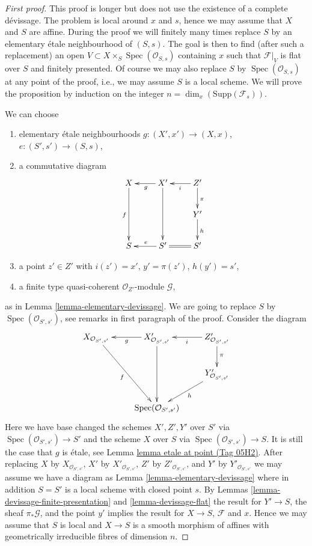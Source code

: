 \documentclass{amsart}
\theoremstyle{plain}
\theoremstyle{definition}
\theoremstyle{remark}
\numberwithin{equation}{subsection}
\def\Spec{\mathop{\mathrm{Spec}}}
\begin{document}
\begin{proof}[First proof]
This proof is longer but does not use the existence of a complete d\'evissage.
The problem is local around $x$ and $s$, hence we may assume that $X$
and $S$ are affine. During the proof we will finitely many times replace
$S$ by an elementary \'etale neighbourhood of $(S, s)$. The goal is then to find
(after such a replacement) an open
$V \subset X \times_S \Spec(\mathcal{O}_{S, s})$ containing $x$
such that $\mathcal{F}|_V$ is flat over $S$ and finitely presented.
Of course we may also replace $S$ by $\Spec(\mathcal{O}_{S, s})$
at any point of the proof, i.e., we may assume $S$ is a local scheme.
We will prove the proposition by induction on the integer
$n = \dim_x(\text{Supp}(\mathcal{F}_s))$.

\medskip\noindent
We can choose
\begin{enumerate}
\item elementary \'etale neighbourhoods $g : (X', x') \to (X, x)$,
$e : (S', s') \to (S, s)$,
\item a commutative diagram
$$
\xymatrix{
X \ar[dd]_f & X' \ar[dd] \ar[l]^g & Z' \ar[l]^i \ar[d]^\pi \\
& & Y' \ar[d]^h \\
S & S' \ar[l]_e & S' \ar@{=}[l]
}
$$
\item a point $z' \in Z'$ with $i(z') = x'$, $y' = \pi(z')$, $h(y') = s'$,
\item a finite type quasi-coherent $\mathcal{O}_{Z'}$-module $\mathcal{G}$,
\end{enumerate}
as in
Lemma \ref{lemma-elementary-devissage}.
We are going to replace $S$ by $\Spec(\mathcal{O}_{S', s'})$, see
remarks in first paragraph of the proof. Consider the diagram
$$
\xymatrix{
X_{\mathcal{O}_{S', s'}} \ar[ddr]_f &
X'_{\mathcal{O}_{S', s'}} \ar[dd] \ar[l]^g &
Z'_{\mathcal{O}_{S', s'}} \ar[l]^i \ar[d]^\pi \\
& & Y'_{\mathcal{O}_{S', s'}} \ar[dl]^h \\
& \Spec(\mathcal{O}_{S', s'})
}
$$
Here we have base changed the schemes $X', Z', Y'$ over $S'$ via
$\Spec(\mathcal{O}_{S', s'}) \to S'$ and the scheme $X$ over $S$ via
$\Spec(\mathcal{O}_{S', s'}) \to S$. It is still the case that
$g$ is \'etale, see
Lemma \href{https://stacks.math.columbia.edu/tag/05H2}{lemma etale at point (Tag 05H2)}.
After replacing $X$ by $X_{\mathcal{O}_{S', s'}}$,
$X'$ by $X'_{\mathcal{O}_{S', s'}}$,
$Z'$ by $Z'_{\mathcal{O}_{S', s'}}$, and
$Y'$ by $Y'_{\mathcal{O}_{S', s'}}$
we may assume we have a diagram as
Lemma \ref{lemma-elementary-devissage}
where in addition $S = S'$ is a local scheme with closed point $s$. By
Lemmas \ref{lemma-devissage-finite-presentation} and
\ref{lemma-devissage-flat}
the result for $Y' \to S$, the sheaf $\pi_*\mathcal{G}$, and the
point $y'$ implies the result for $X \to S$, $\mathcal{F}$ and $x$.
Hence we may assume that $S$ is local and $X \to S$ is a smooth morphism
of affines with geometrically irreducible fibres of dimension $n$.


\end{proof}
\end{document}
